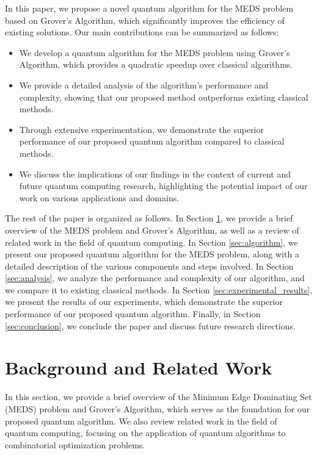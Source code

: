 In this paper, we propose a novel quantum algorithm for the MEDS problem based on Grover's Algorithm, which significantly improves the efficiency of existing solutions. Our main contributions can be summarized as follows:

\begin{itemize}
    \item We develop a quantum algorithm for the MEDS problem using Grover's Algorithm, which provides a quadratic speedup over classical algorithms.
    \item We provide a detailed analysis of the algorithm's performance and complexity, showing that our proposed method outperforms existing classical methods.
    \item Through extensive experimentation, we demonstrate the superior performance of our proposed quantum algorithm compared to classical methods.
    \item We discuss the implications of our findings in the context of current and future quantum computing research, highlighting the potential impact of our work on various applications and domains.
\end{itemize}

The rest of the paper is organized as follows. In Section \ref{sec:background}, we provide a brief overview of the MEDS problem and Grover's Algorithm, as well as a review of related work in the field of quantum computing. In Section \ref{sec:algorithm}, we present our proposed quantum algorithm for the MEDS problem, along with a detailed description of the various components and steps involved. In Section \ref{sec:analysis}, we analyze the performance and complexity of our algorithm, and we compare it to existing classical methods. In Section \ref{sec:experimental_results}, we present the results of our experiments, which demonstrate the superior performance of our proposed quantum algorithm. Finally, in Section \ref{sec:conclusion}, we conclude the paper and discuss future research directions.

\section{Background and Related Work}\label{sec:background}

In this section, we provide a brief overview of the Minimum Edge Dominating Set (MEDS) problem and Grover's Algorithm, which serves as the foundation for our proposed quantum algorithm. We also review related work in the field of quantum computing, focusing on the application of quantum algorithms to combinatorial optimization problems.

